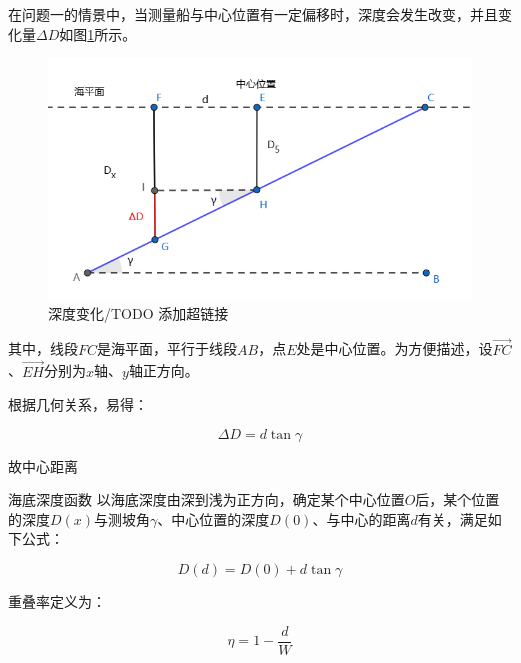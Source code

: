 在问题一的情景中，当测量船与中心位置有一定偏移时，深度会发生改变，并且变化量$\Delta D$如图\ref{fig:深度变化}所示。



\begin{figure}[h]
    \centering
    \includegraphics[scale=0.5]{res/img/深度变化.png}
    \caption{深度变化/TODO 添加超链接}
    \label{fig:深度变化}
\end{figure}

其中，线段$FC$是海平面，平行于线段$AB$，点$E$处是中心位置。为方便描述，设$\overrightarrow{FC}$、$\overrightarrow{EH}$分别为$x$轴、$y$轴正方向。

根据几何关系，易得：

\begin{equation}
    \Delta D = d\tan\gamma
\end{equation}

故中心距离\newline\newline\newline\newline

\begin{mcmTheorem}{海底深度函数}
    以海底深度由深到浅为正方向，确定某个中心位置$O$后，某个位置的深度$D(x)$与测坡角$\gamma$、中心位置的深度$D(0)$、与中心的距离$d$有关，满足如下公式：

    \begin{equation}
        D(d) = D(0) + d\tan\gamma
    \end{equation}
\end{mcmTheorem}

重叠率定义为：

\begin{equation}
    \eta = 1 - \frac{d}{W}
\end{equation}

